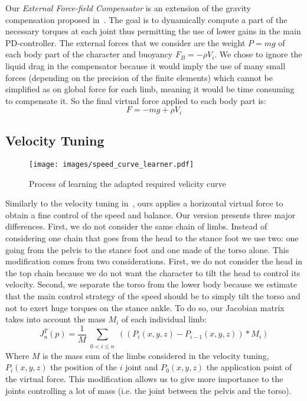 \documentclass[conference]{acmsiggraph}
\begin{document}
Our \textit{External Force-field Compensator} is an extension of the gravity compensation proposed in~\cite{coros2010generalized}. The goal is to dynamically compute a part of the necessary torques at each joint thus permitting the use of lower gains in the main PD-controller.
The external forces that we consider are the weight $P=mg$ of each body part of the character and buoyancy $F_B=-\rho V_i$. We chose to ignore the liquid drag in the compensator because it would imply the use of many small forces (depending on the precision of the finite elements) which cannot be simplified as on global force for each limb, meaning it would be time consuming to compensate it. %
So the final virtual force applied to each body part is:
$$
F=-mg+\rho V_i
$$

\subsection{Velocity Tuning}
\label{sec:speed_virt_force}

\begin{figure*}[t]
\centering
\texttt{[image: images/speed\_curve\_learner.pdf]}
\caption{Process of learning the adapted required velicity curve}
\label{fig:speed_curve_learner}
\end{figure*}

Similarly to the velocity tuning in~\cite{coros2010generalized}, ours applies a horizontal virtual force to obtain a fine control of the speed and balance. Our version presents three major differences. First, we do not consider the same chain of limbs. Instead of considering one chain that goes from the head to the stance foot we use two: one going from the pelvis to the stance foot and one made of the torso alone. This modification comes from two considerations. First, we do not consider the head in the top chain because we do not want the character to tilt the head to control its velocity. Second, we separate the torso from the lower body because we estimate that the main control strategy of the speed should be to simply tilt the torso and not to exert huge torques on the stance ankle. To do so, our Jacobian matrix takes into account the mass $M_i$ of each individual limb:
$$
J_n ^T (p)=\frac{1}{M}\sum_{\substack{0<i\leq n}} ((P_i(x,y,z)-P_{i-1}(x,y,z))*M_i)
$$
Where $M$ is the mass sum of the limbs considered in the velocity tuning, $P_i(x,y,z)$ the position of the $i$ joint and $P_0(x,y,z)$ the application point of the virtual force. This modification allows us to give more importance to the joints controlling a lot of mass (i.e. the joint between the pelvis and the torso).
\end{document}
